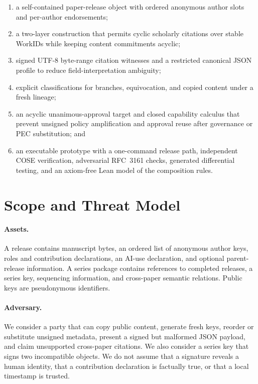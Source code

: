 \documentclass[11pt]{article}
\newcommand{\workid}{\textsf{WorkID}}
\begin{document}
\begin{enumerate}
  \item a self-contained paper-release object with ordered anonymous author slots and per-author endorsements;
  \item a two-layer construction that permits cyclic scholarly citations over stable \workid s while keeping content commitments acyclic;
  \item signed UTF-8 byte-range citation witnesses and a restricted canonical JSON profile to reduce field-interpretation ambiguity;
  \item explicit classifications for branches, equivocation, and copied content under a fresh lineage;
  \item an acyclic unanimous-approval target and closed capability calculus that prevent unsigned policy amplification and approval reuse after governance or PEC substitution; and
  \item an executable prototype with a one-command release path, independent COSE verification, adversarial RFC~3161 checks, generated differential testing, and an axiom-free Lean model of the composition rules.
\end{enumerate}

\section{Scope and Threat Model}

\paragraph{Assets.} A release contains manuscript bytes, an ordered list of anonymous author keys, roles and contribution declarations, an AI-use declaration, and optional parent-release information. A series package contains references to completed releases, a series key, sequencing information, and cross-paper semantic relations. Public keys are pseudonymous identifiers.

\paragraph{Adversary.} We consider a party that can copy public content, generate fresh keys, reorder or substitute unsigned metadata, present a signed but malformed JSON payload, and claim unsupported cross-paper citations. We also consider a series key that signs two incompatible objects. We do not assume that a signature reveals a human identity, that a contribution declaration is factually true, or that a local timestamp is trusted.
\end{document}

